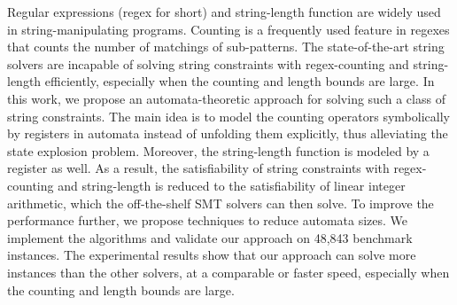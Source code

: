 
Regular expressions (regex for short) and string-length function are widely used in string-manipulating programs. Counting is a frequently used feature in regexes that counts the number of matchings of sub-patterns. 
The state-of-the-art string solvers are incapable of solving string constraints with regex-counting and string-length eﬀiciently, especially when the counting and length bounds are large. 
In this work, we propose an automata-theoretic approach for solving such a class of string constraints. 
The main idea is to model the counting operators symbolically by registers in automata instead of unfolding them explicitly, thus alleviating the state explosion problem. Moreover, the string-length function is modeled by a register as well. 
As a result, the satisfiability of string constraints with regex-counting and string-length is reduced to the satisfiability of linear integer arithmetic, which the off-the-shelf SMT solvers can then solve. 
To improve the performance further, we propose techniques to reduce automata sizes. We implement the algorithms and validate our approach on 48,843 benchmark instances. 
The experimental results show that our approach can solve more instances than the other solvers, at a comparable or faster speed, especially when the counting and length bounds are large.